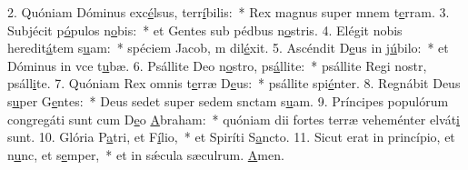 2. Quóniam Dóminus exc\uline{é}lsus, terr\uline{í}bilis:~* Rex magnus super mnem t\uline{e}rram.
3. Subjécit p\uline{ó}pulos n\uline{o}bis:~* et Gentes sub pédbus n\uline{o}stris.
4. Elégit nobis heredit\uline{á}tem s\uline{u}am:~* spéciem Jacob, m dil\uline{é}xit.
5. Ascéndit D\uline{e}us in j\uline{ú}bilo:~* et Dóminus in vce t\uline{u}bæ.
6. Psállite Deo n\uline{o}stro, ps\uline{á}llite:~* psállite Regi nostr, psáll\uline{i}te.
7. Quóniam Rex omnis t\uline{e}rræ D\uline{e}us:~* psállite spi\uline{é}nter.
8. Regnábit Deus s\uline{u}per G\uline{e}ntes:~* Deus sedet super sedem snctam s\uline{u}am.
9. Príncipes populórum congregáti sunt cum D\uline{e}o \uline{A}braham:~* quóniam dii fortes terræ veheménter elvát\uline{i} sunt.
10. Glória P\uline{a}tri, et F\uline{í}lio,~* et Spiríti S\uline{a}ncto.
11. Sicut erat in princípio, et n\uline{u}nc, et s\uline{e}mper,~* et in sǽcula sæculrum. \uline{A}men.

